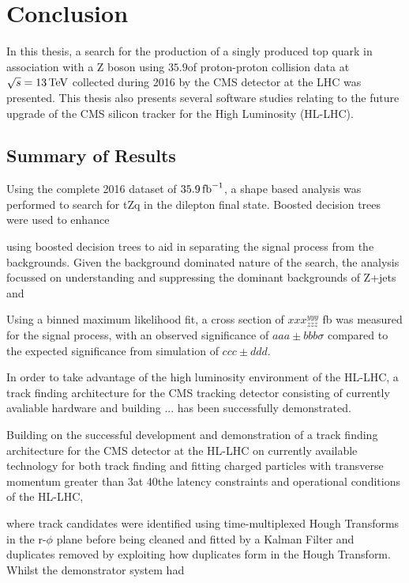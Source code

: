 \chapter{Conclusion}\label{chapter:conclusion}
In this thesis, a search for the production of a singly produced top quark in association with a Z boson using $35.9$\fbinv of proton-proton collision data at $\sqrt{s} = 13\,\text{Te\hspace{-.08em}V}$ collected during 2016 by the CMS detector at the LHC was presented.
This thesis also presents several software studies relating to the future upgrade of the CMS silicon tracker for the High Luminosity (HL-LHC).

\section{Summary of Results}
Using the complete 2016 dataset of $35.9\mbox{\ensuremath{\,\text{fb}^\text{$-$1}}}$, a shape based analysis was performed to search for tZq in the dilepton final state.
Boosted decision trees were used to enhance 	

 using boosted decision trees to aid in separating the signal process from the backgrounds.
Given the background dominated nature of the search, the analysis focussed on understanding and suppressing the dominant backgrounds of Z+jets and \ttbar

Using a binned maximum likelihood fit, a cross section of $xxx^{yyy}_{zzz}$ fb was measured for the signal process, with an observed significance of $aaa \pm bbb \sigma$ compared to the expected significance from simulation of $ccc \pm ddd$. 



In order to take advantage of the high luminosity environment of the HL-LHC, a track finding architecture for the CMS tracking detector consisting of currently avaliable hardware and building ... has been successfully demonstrated.


Building on the successful development and demonstration of a track finding architecture for the CMS detector at the HL-LHC on currently available technology for both track finding and fitting charged particles with transverse momentum greater than 3\GeV at 40\MHz the latency constraints and operational conditions of the HL-LHC, 


where track candidates were identified using time-multiplexed Hough Transforms in the r-$\phi$ plane before being cleaned and fitted by a Kalman Filter and duplicates removed by exploiting how duplicates form in the Hough Transform. 
Whilst the demonstrator system had 

